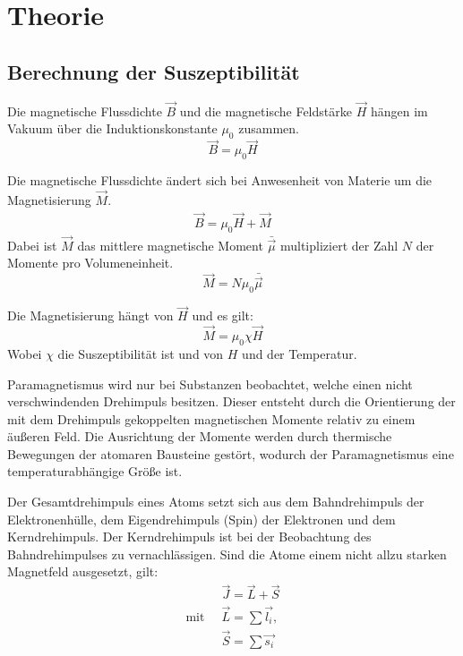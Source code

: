\section{Theorie}
\label{sec:Theorie}

\cite{sample}
\subsection{Berechnung der Suszeptibilität}
Die magnetische Flussdichte $\vec{B}$ und die magnetische Feldstärke $\vec{H}$ hängen im Vakuum über die
Induktionskonstante $\mu_0$ zusammen.
\begin{equation}
  \vec{B} = \mu_0 \vec{H}
\end{equation}

Die magnetische Flussdichte ändert sich bei Anwesenheit von Materie um die Magnetisierung $\vec{M}$.
\begin{align}
  \vec{B} = \mu_0 \vec{H} + \vec{M}
\end{align}
Dabei ist $\vec{M}$ das mittlere magnetische Moment $\bar{\vec{\mu}}$ multipliziert der Zahl $N$ der Momente pro
Volumeneinheit.
\begin{equation}
  \vec{M} = N \mu_0 \bar{\vec{\mu}}
\end{equation}

Die Magnetisierung hängt von $\vec{H}$ und es gilt:
\begin{equation}
  \vec{M} = \mu_0 \chi \vec{H}
\end{equation}
Wobei $\chi$ die Suszeptibilität ist und von $H$ und der Temperatur.

Paramagnetismus wird nur bei Substanzen beobachtet, welche einen nicht verschwindenden Drehimpuls besitzen.
Dieser entsteht durch die Orientierung der mit dem Drehimpuls gekoppelten magnetischen
Momente relativ zu einem äußeren Feld. Die Ausrichtung der Momente werden durch thermische Bewegungen
der atomaren Bausteine gestört, wodurch der Paramagnetismus eine temperaturabhängige Größe ist.

Der Gesamtdrehimpuls eines Atoms setzt sich aus dem
Bahndrehimpuls der Elektronenhülle, dem Eigendrehimpuls (Spin) der Elektronen und
dem Kerndrehimpuls. Der Kerndrehimpuls ist bei der Beobachtung des Bahndrehimpulses zu
vernachlässigen. Sind die Atome einem nicht allzu starken Magnetfeld ausgesetzt, gilt:
\begin{align*}
  &\vec{J} = \vec{L} + \vec{S} \\
  \text{mit} \;\; &\vec{L} = \sum \vec{l_i}, \\
  &\vec{S} = \sum \vec{s_i}
\end{align*}

